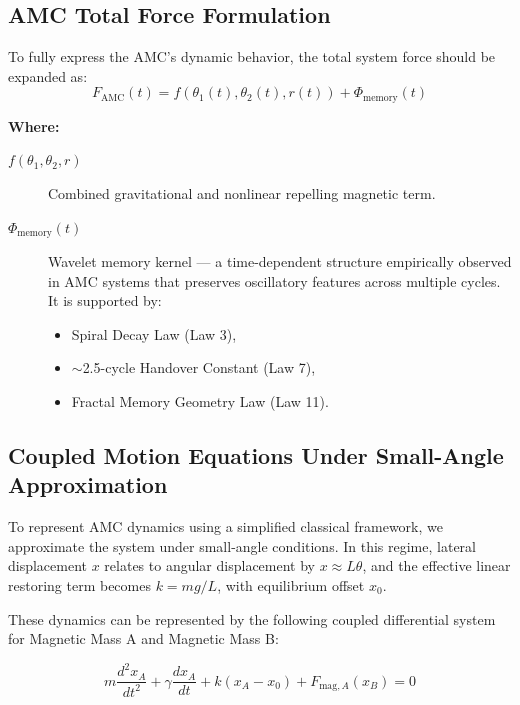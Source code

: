 \documentclass[10pt,aps,pre,onecolumn,superscriptaddress,notitlepage]{revtex4-2}
\begin{document}
\subsection{AMC Total Force Formulation} %

To fully express the AMC’s dynamic behavior, the total system force should be expanded as:
\begin{equation}
F_{\text{AMC}}(t) = f(\theta_1(t), \theta_2(t), r(t)) + \Phi_{\text{memory}}(t)
\label{eq:amc_force}
\end{equation}

\textbf{Where:}
\begin{description}
    \item[$f(\theta_1, \theta_2, r)$] Combined gravitational and nonlinear repelling magnetic term.
    
    \item[$\Phi_{\text{memory}}(t)$] Wavelet memory kernel — a time-dependent structure empirically observed in AMC systems that preserves oscillatory features across multiple cycles. It is supported by:
    \begin{itemize}
        \item Spiral Decay Law (Law 3),
        \item $\sim$2.5-cycle Handover Constant (Law 7),
        \item Fractal Memory Geometry Law (Law 11).
    \end{itemize}
\end{description}
\subsection{Coupled Motion Equations Under Small-Angle Approximation} %

To represent AMC dynamics using a simplified classical framework, we approximate the system under small-angle conditions. In this regime, lateral displacement $x$ relates to angular displacement by $x \approx L\theta$, and the effective linear restoring term becomes $k = mg/L$, with equilibrium offset $x_0$.

These dynamics can be represented by the following coupled differential system for Magnetic Mass A and Magnetic Mass B:

\begin{equation}
m \frac{d^2 x_A}{dt^2} + \gamma \frac{dx_A}{dt} + k(x_A - x_0) + F_{\text{mag},A}(x_B) = 0
\label{eq:massA}
\end{equation}
\end{document}
